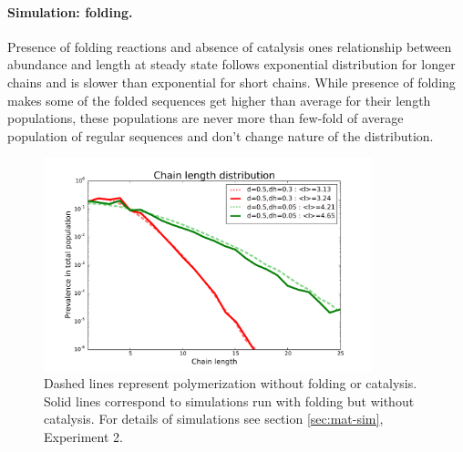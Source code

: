 \documentclass[12pt]{paper}
\begin{document}
\paragraph{Simulation: folding.} Presence of folding reactions and absence of catalysis ones 
relationship between abundance and length at steady state follows exponential distribution for 
longer chains and is slower than exponential for short chains. While presence of folding makes 
some of the folded sequences get higher than average for their length populations, these 
populations are never more than few-fold of average population of regular sequences and don't 
change nature of the distribution.
\begin{figure}[h!]
  \centering
  \includegraphics[width=0.85\textwidth]{pictures/flory-and-fold.pdf} 
  \caption{Dashed lines represent polymerization without folding or catalysis. Solid lines 
correspond to simulations run with folding but without catalysis. For details of simulations see 
section \ref{sec:mat-sim}, Experiment 2. }
  \label{fig:sim.flory-fold}
\end{figure}
\end{document}
